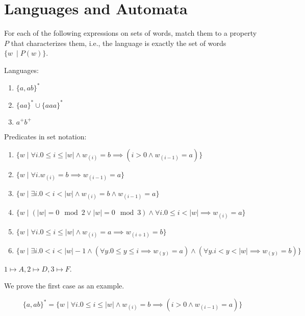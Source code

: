 
\section{Languages and Automata}

\begin{exercise}{}

  For each of the following expressions on sets of words, match them to a
  property \(P\) that characterizes them, i.e., the language is exactly the set
  of words \(\{ w \ \mid P(w) \}\).

  Languages:
  \begin{enumerate}
    \item \(\{a,ab\}^*\)
    \item \(\{aa\}^* \cup \{aaa\}^*\)
    \item \(a^+b^+\)
  \end{enumerate}

  Predicates in set notation:
  \begin{enumerate}
    \renewcommand{\theenumi}{\Alph{enumi}}
    \item \(\{w \mid \forall i. 0 \le i \le |w| \land w_{(i)} = b \implies (i > 0 \land w_{(i - 1)} = a)\}\) %
    \item \(\{w \mid \forall i. w_{(i)} = b \implies w_{(i - 1)} = a\}\) %
    \item \(\{w \mid \exists i. 0 < i < |w| \land w_{(i)} = b \land w_{(i - 1)} = a\}\) %
    \item \(\{w \mid (|w| = 0 \mod 2 \lor |w| = 0 \mod 3) \land \forall i. 0 \leq i < |w| \implies w_{(i)} = a\}\) %
    \item \(\{w \mid \forall i. 0 \le i \le |w| \land w_{(i)} = a \implies w_{(i + 1)} = b\}\) %
    \item \(\{w \mid \exists i. 0 < i < |w| - 1 \land 
    (\forall y. 0 \leq y \leq i \implies w_{(y)} = a) \land  (\forall y. i < y < |w| \implies w_{(y)} = b) \}\) %
  \end{enumerate}



  \begin{solution}
    
    \(1 \mapsto A, 2 \mapsto D, 3 \mapsto F\).

    We prove the first case as an example.

    \begin{equation*}
      \{a,ab\}^* = \{w \mid \forall i. 0 \le i \le |w| \land w_{(i)} = b \implies (i > 0 \land w_{(i - 1)} = a)\}
    \end{equation*}


\end{solution}
\end{exercise}
